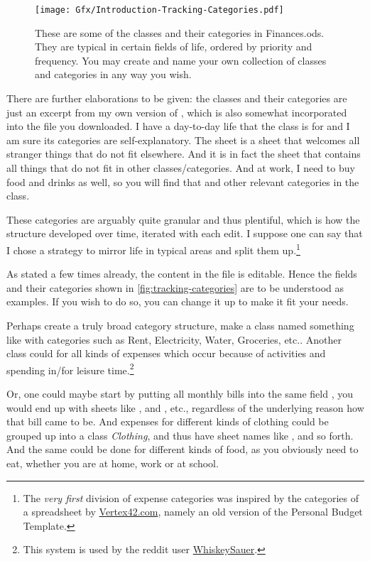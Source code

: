 \begin{figure}[htp]
	\centering
	\texttt{[image: Gfx/Introduction-Tracking-Categories.pdf]}
	\caption[Tracking Categories]{These are some of the classes and their categories in Finances.ods.
	They are typical in certain fields of life, ordered by priority and frequency.
	You may create and name your own collection of classes and categories in any way you wish.%
	}
	\label{fig:tracking-categories}
\end{figure}

There are further elaborations to be given:
the classes and their categories are just an excerpt from my own version of \tfn, which is also somewhat incorporated into the file you downloaded.
I have a day-to-day life that the class  is for and I am sure its categories are self-explanatory.
The sheet  is a sheet that welcomes all stranger things that do not fit elsewhere.
And it is in fact the sheet that contains all  things that do not fit in other classes/categories.
And at work, I need to buy food and drinks as well, so you will find that and other relevant categories in the  class.

These categories are arguably quite granular and thus plentiful, which is how the structure developed over time, iterated with each edit.
I suppose one can say that I chose a strategy to mirror life in typical areas and split them up.\footnote{The \emph{very first} division of expense categories was inspired by the categories of a spreadsheet by \href{https://www.vertex42.com/}{Vertex42.com}, namely an old version of the Personal Budget Template.}

As stated a few times already, the content in the file is editable.
Hence the fields and their categories shown in \autoref{fig:tracking-categories} are to be understood as examples.
If you wish to do so, you can change it up to make it fit your needs.

Perhaps create a truly broad category structure, \ie make a class named something like  with categories such as Rent, Electricity, Water, Groceries, etc..
Another class could  for all kinds of expenses which occur because of activities and spending in/for leisure time.\footnote{This system is used by the reddit user \href{https://www.reddit.com/r/personalfinance/comments/aayvms/oc_i_tracked_every_dollar_i_spent_over_the_last_8/}{WhiskeySauer}.}

Or, one could maybe start by putting all monthly bills into the same field , \ie you would end up with sheets like ,  and , etc., regardless of the underlying reason how that bill came to be.
And expenses for different kinds of clothing could be grouped up into a class \emph{Clothing}, and thus have sheet names like ,  and so forth.
And the same could be done for different kinds of food, as you obviously need to eat, whether you are at home, work or at school.

